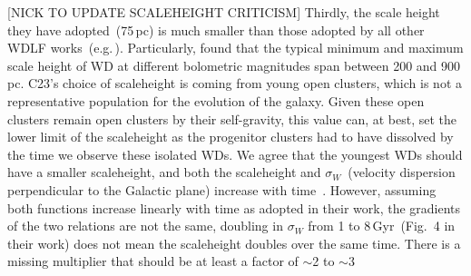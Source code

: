 \documentclass[fleqn,usenatbib]{mnras}
\begin{document}
\textcolor{nick}{[NICK TO UPDATE SCALEHEIGHT CRITICISM]}
%
%
%
%
%
%
%
Thirdly, the scale height they have adopted~(75\,pc) is much smaller than those
adopted by all other WDLF works~(e.g.\,\citealt{2006AJ....131..571H,
2011MNRAS.417...93R, 2019MNRAS.482..715L}). Particularly,
\citet{2006AJ....131..571H} found that the typical minimum and maximum scale
height of WD at different bolometric magnitudes span between 200 and 900\,pc.
C23's choice of scaleheight is coming from young open clusters, which is not
a representative population for the evolution of the galaxy. Given these open
clusters remain open clusters by their self-gravity, this value can, at best,
set the lower limit of the scaleheight as the progenitor clusters had to have
dissolved by the time we observe these isolated WDs. We agree that the youngest
WDs should have a smaller scaleheight, and both the scaleheight and
$\sigma_W$~(velocity dispersion perpendicular to the Galactic plane) increase
with time~\citep{2019MNRAS.484.3544R}. However, assuming both functions
increase linearly with time as adopted in their work, the gradients of the two
relations are not the same, doubling in $\sigma_W$ from 1 to 8\,Gyr~(Fig.~4 in
their work) does not mean the scaleheight doubles over the same time. There is
a missing multiplier that should be at least a factor of $\sim$2 to $\sim$3
\end{document}
